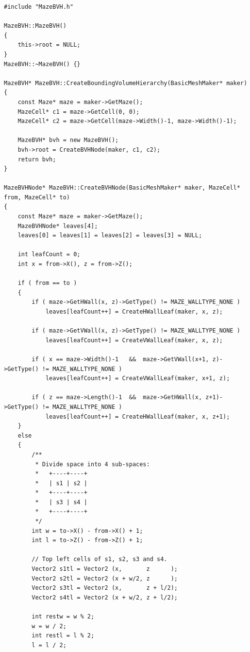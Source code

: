 \lstCpp
\begin{lstlisting}[caption=The \texttt{MazeBVH} class]
#include "MazeBVH.h"

MazeBVH::MazeBVH() 
{
    this->root = NULL;
}
MazeBVH::~MazeBVH() {}

MazeBVH* MazeBVH::CreateBoundingVolumeHierarchy(BasicMeshMaker* maker)
{
    const Maze* maze = maker->GetMaze();
    MazeCell* c1 = maze->GetCell(0, 0);
    MazeCell* c2 = maze->GetCell(maze->Width()-1, maze->Width()-1);
    
    MazeBVH* bvh = new MazeBVH();
    bvh->root = CreateBVHNode(maker, c1, c2);
    return bvh;
}

MazeBVHNode* MazeBVH::CreateBVHNode(BasicMeshMaker* maker, MazeCell* from, MazeCell* to)
{
    const Maze* maze = maker->GetMaze();
    MazeBVHNode* leaves[4];
    leaves[0] = leaves[1] = leaves[2] = leaves[3] = NULL;
    
    int leafCount = 0;
    int x = from->X(), z = from->Z();
    
    if ( from == to )
    {
        if ( maze->GetHWall(x, z)->GetType() != MAZE_WALLTYPE_NONE )
            leaves[leafCount++] = CreateHWallLeaf(maker, x, z);
        
        if ( maze->GetVWall(x, z)->GetType() != MAZE_WALLTYPE_NONE )
            leaves[leafCount++] = CreateVWallLeaf(maker, x, z);
        
        if ( x == maze->Width()-1   &&  maze->GetVWall(x+1, z)->GetType() != MAZE_WALLTYPE_NONE )
            leaves[leafCount++] = CreateVWallLeaf(maker, x+1, z);
        
        if ( z == maze->Length()-1  &&  maze->GetHWall(x, z+1)->GetType() != MAZE_WALLTYPE_NONE )
            leaves[leafCount++] = CreateHWallLeaf(maker, x, z+1);
    }
    else
    {
        /**
         * Divide space into 4 sub-spaces:
         *   +----+----+
         *   | s1 | s2 |
         *   +----+----+
         *   | s3 | s4 |
         *   +----+----+
         */
        int w = to->X() - from->X() + 1;
        int l = to->Z() - from->Z() + 1;
        
        // Top left cells of s1, s2, s3 and s4.
        Vector2 s1tl = Vector2 (x,       z      );
        Vector2 s2tl = Vector2 (x + w/2, z      );
        Vector2 s3tl = Vector2 (x,       z + l/2);
        Vector2 s4tl = Vector2 (x + w/2, z + l/2);
        
        int restw = w % 2;
        w = w / 2;
        int restl = l % 2;
        l = l / 2;
        

\end{lstlisting}
